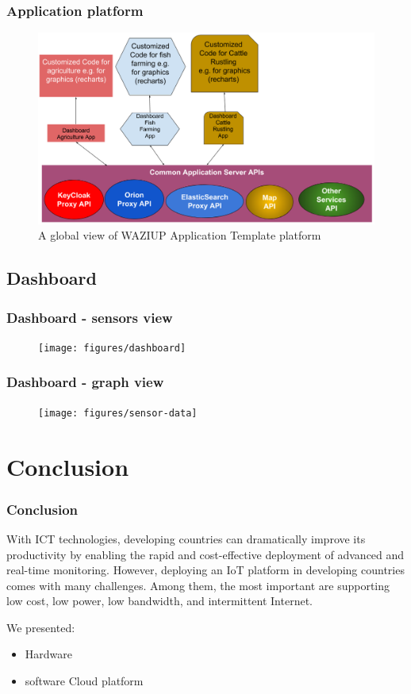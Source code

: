 \documentclass{beamer}
\begin{document}
\begin{frame}
\frametitle{Application platform}

  \begin{figure}[H]  
  \centering  
  \includegraphics[width=.68\linewidth]{figures/AppArchitecture.png}   
  \caption{A global view of WAZIUP Application Template platform}
  \label{fig-app}
  \end{figure}
 
\end{frame}

\subsection{Dashboard}

\begin{frame}
\frametitle{Dashboard - sensors view}

  \begin{figure}[H]  
  \centering  
  \texttt{[image: figures/dashboard]} 
  \label{fig-dashboard}
  \end{figure}

\end{frame}
  
\begin{frame}
\frametitle{Dashboard - graph view}

\vspace{-1cm}
  \begin{figure}
  \centering
  \texttt{[image: figures/sensor-data]}
  \end{figure}
 
\end{frame}


\section{Conclusion}

\begin{frame}
\frametitle{Conclusion}
  
With ICT technologies, developing countries can dramatically improve its productivity by enabling the rapid and cost-effective deployment of advanced and real-time monitoring.
However, deploying an IoT platform in developing countries comes with many challenges.
Among them, the most important are supporting low cost, low power, low bandwidth, and intermittent Internet.

We presented:
  \begin{itemize}
    \item Hardware
    \item software Cloud platform 
  \end{itemize}

\end{frame}
\end{document}
